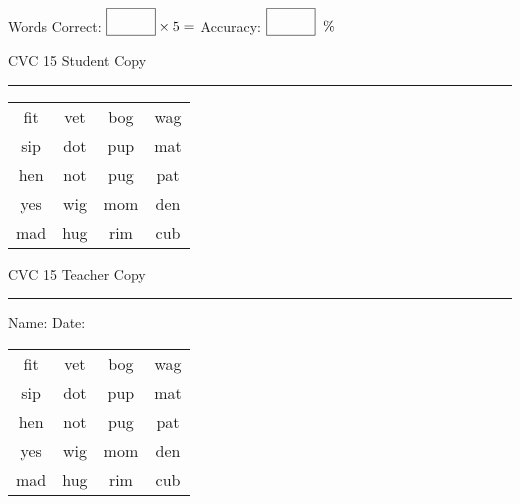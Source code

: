\documentclass{memoir}
\begin{document}
\normalsize

Words Correct: $\fbox{\phantom{\huge 100}} \times 5 = $ Accuracy: $\fbox{\phantom{\huge 100}}\;\; \%$ 

\vfill

\newpage


\footnotesize \noindent
CVC 15 \hfill Student Copy
\smallskip
\hrule

\huge

\setlength{\tabcolsep}{14pt}
\def\arraystretch{2}

{\selectfont


\begin{vplace}[0.5]
\begin{center}
\begin{tabular}{cccc}
fit & vet & bog & wag \\
sip & dot & pup & mat \\
hen & not & pug & pat \\
yes & wig & mom & den \\
mad & hug & rim & cub \\
\end{tabular}
\end{center}
\end{vplace}

}

\newpage

\footnotesize \noindent
CVC 15 \hfill Teacher Copy
\smallskip
\hrule

\normalsize

\vfill

\noindent
Name: \underline{\hspace{1.75in}} \hfill Date: \underline{\hspace{1in}}

\huge

{\selectfont


\begin{vplace}[0.5]
\begin{center}
\begin{tabular}{cccc}
fit & vet & bog & wag \\
sip & dot & pup & mat \\
hen & not & pug & pat \\
yes & wig & mom & den \\
mad & hug & rim & cub \\
\end{tabular}
\end{center}
\end{vplace}



}
\end{document}
